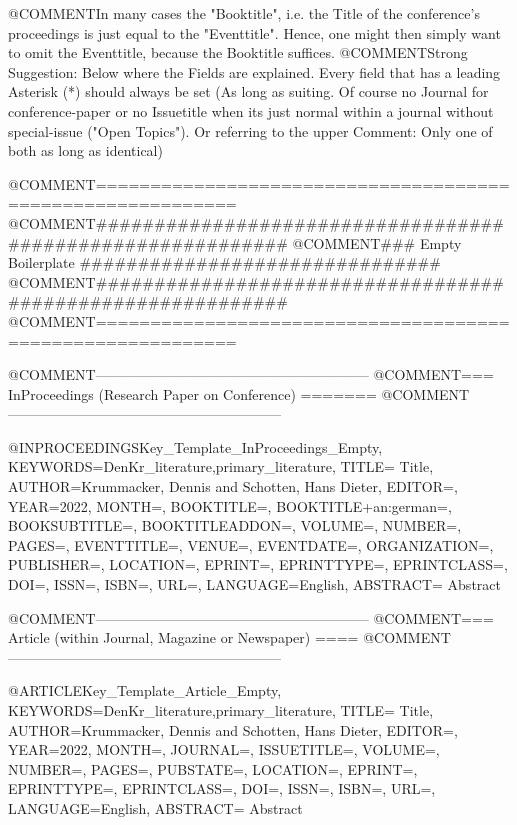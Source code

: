 
@COMMENT{In many cases the "Booktitle", i.e. the Title of the conference's proceedings is just equal to the "Eventtitle". Hence, one might then simply want to omit the Eventtitle, because the Booktitle suffices.}
@COMMENT{Strong Suggestion: Below where the Fields are explained. Every field that has a leading Asterisk (*) should always be set (As long as suiting. Of course no Journal for conference-paper or no Issuetitle when its just normal within a journal without special-issue ("Open Topics"). Or referring to the upper Comment: Only one of both as long as identical)}




@COMMENT{===========================================================}
@COMMENT{###########################################################}
@COMMENT{###    Empty Boilerplate    ###############################}
@COMMENT{###########################################################}
@COMMENT{===========================================================}


@COMMENT{-----------------------------------------------------------}
@COMMENT{===  InProceedings  (Research Paper on Conference)  =======}
@COMMENT{-----------------------------------------------------------}

@INPROCEEDINGS{Key_Template_InProceedings_Empty,
    KEYWORDS={DenKr_literature,primary_literature},
    TITLE={\begingroup
        Title\endgroup},
    AUTHOR={Krummacker, Dennis and Schotten, Hans Dieter},
    EDITOR={},
    YEAR={2022},
    MONTH={},
    BOOKTITLE={},
    BOOKTITLE+an:german={},
    BOOKSUBTITLE={},
    BOOKTITLEADDON={},
    VOLUME={},
    NUMBER={},
    PAGES={},
    EVENTTITLE={},
    VENUE={},
    EVENTDATE={},
    ORGANIZATION={},
    PUBLISHER={},
    LOCATION={},
    EPRINT={},
    EPRINTTYPE={},
    EPRINTCLASS={},
    DOI={},
    ISSN={},
    ISBN={},
    URL={},
    LANGUAGE={English},
    ABSTRACT={\begingroup
        Abstract\endgroup}
}



@COMMENT{-----------------------------------------------------------}
@COMMENT{===  Article  (within Journal, Magazine or Newspaper)  ====}
@COMMENT{-----------------------------------------------------------}

@ARTICLE{Key_Template_Article_Empty,
    KEYWORDS={DenKr_literature,primary_literature},
    TITLE={\begingroup
        Title\endgroup},
    AUTHOR={Krummacker, Dennis and Schotten, Hans Dieter},
    EDITOR={},
    YEAR={2022},
    MONTH={},
    JOURNAL={},
    ISSUETITLE={},
    VOLUME={},
    NUMBER={},
    PAGES={},
    PUBSTATE={},
    LOCATION={},
    EPRINT={},
    EPRINTTYPE={},
    EPRINTCLASS={},
    DOI={},
    ISSN={},
    ISBN={},
    URL={},
    LANGUAGE={English},
    ABSTRACT={\begingroup
        Abstract\endgroup}
}










